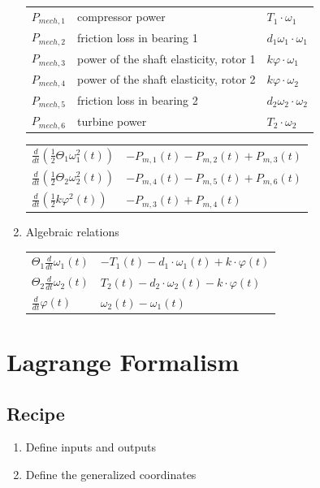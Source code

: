 \documentclass[10pt,a4paper]{scrartcl}
\begin{document}
\begin{multicols*}{3}
\begin{enumerate}
\small \begin{tabular}{l@{ = }l@{ = }l}
$P_{mech,1}$&compressor power& $T_1\cdot \omega_1$\\
$P_{mech,2}$&friction loss in bearing 1& $d_1\omega_1\cdot \omega_1$\\
$P_{mech,3}$&power of the shaft elasticity, rotor 1&$k\varphi\cdot\omega_1$\\
$P_{mech,4}$&power of the shaft elasticity, rotor 2&$k\varphi\cdot\omega_2$\\
$P_{mech,5}$&friction loss in bearing 2&$d_2\omega_2\cdot\omega_2$\\
$P_{mech,6}$&turbine power&$T_2\cdot\omega_2$
\end{tabular}
\normalsize

\vspace{3ex}

\begin{tabular}{l@{ = }l}
$\frac{d}{dt}\left(\frac{1}{2}\Theta_1\omega_1^2(t)\right)$&$-P_{m,1}(t)-P_{m,2}(t)+P_{m,3}(t)$\\
$\frac{d}{dt}\left(\frac{1}{2}\Theta_2\omega_2^2(t)\right)$&$-P_{m,4}(t)-P_{m,5}(t)+P_{m,6}(t)$\\
$\frac{d}{dt}\left(\frac{1}{2}k\varphi^2(t)\right)$&$-P_{m,3}(t)+P_{m,4}(t)$
\end{tabular}
\item Algebraic relations

\begin{tabular}{l@{ = }l}
$\Theta_1\frac{d}{dt} \omega_1(t)$&$-T_1(t)-d_1\cdot\omega_1(t)+k\cdot\varphi(t)$\\
$\Theta_2\frac{d}{dt}\omega_2(t)$&$T_2(t)-d_2\cdot\omega_2(t)-k\cdot\varphi(t)$\\
$\frac{d}{dt}\varphi(t)$&$\omega_2(t)-\omega_1(t)$
\end{tabular}
\end{enumerate}


\vfill
\null
\columnbreak

\section{Lagrange Formalism}\label{lagrange}

\subsection{Recipe}

\begin{enumerate}
\item Define inputs and outputs
\item Define the generalized coordinates


\end{enumerate}
\end{multicols*}
\end{document}
